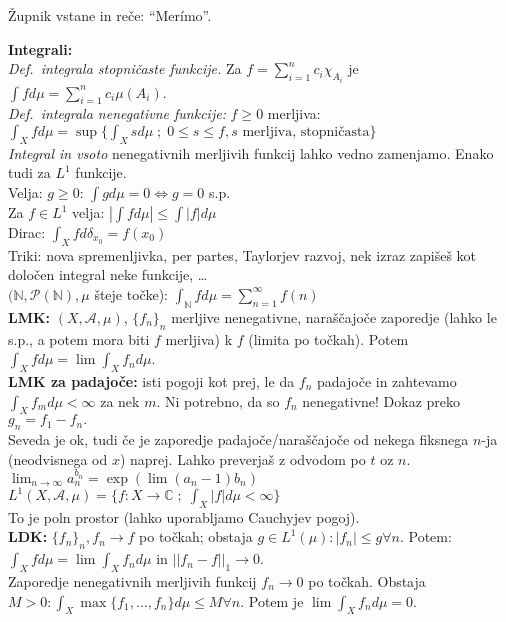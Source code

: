 \documentclass[a4paper,oneside,10pt]{article}
\title{\Title}
\author{\Author}
\date{\today}
\theoremstyle{definition}
\newcommand{\N}{\ensuremath{\mathbb{N}}}
\renewcommand{\C}{\ensuremath{\mathbb{C}}}
\newcommand{\A}{\ensuremath{\mathcal{A}}}
\renewcommand{\P}{\ensuremath{\mathcal{P}}}
\renewcommand{\N}{\ensuremath{\mathbb{N}}}
\renewcommand{\C}{\ensuremath{\mathbb{C}}}
\begin{document}
Župnik vstane in reče: ``Mer\'{i}mo''.

\textbf{\large Integrali:}\\
\textit{Def.~integrala stopničaste funkcije.} Za $f = \sum_{i=1}^n c_i \chi_{A_i}$ je
$\int f d\mu = \sum_{i=1}^n c_i \mu(A_i)$.\\
\textit{Def.\ integrala nenegativne funkcije: }$f \geq 0$ merljiva: $\int_X f d\mu =
\sup\{\int_X s d\mu\; ; \; 0 \leq s \leq f, s \text{ merljiva, stopničasta}\}$\\
\textit{Integral in vsoto} nenegativnih merljivih funkcij lahko vedno zamenjamo.
Enako tudi za $L^1$ funkcije.\\
Velja: $g\geq 0$: $\int g d \mu = 0 \iff g = 0$ s.p.\\
Za $f \in L^1$ velja: $|\int f d \mu| \leq \int |f| d \mu$\\
Dirac: $\int_X f d\delta_{x_0} = f(x_0)$\\
Triki: nova spremenljivka, per partes, Taylorjev razvoj, nek izraz zapišeš kot določen integral neke funkcije, \ldots\\
$(\N, \P(\N), \mu$ šteje točke): $\int_{\N} f d \mu = \sum_{n=1}^\infty f(n)$\\
\textbf{LMK: } $(X, \A, \mu)$, $\{f_n\}_n$ merljive nenegativne, naraščajoče zaporedje
(lahko le s.p., a potem mora biti $f$ merljiva) k $f$ (limita po točkah). Potem
$\int_X f d \mu = \lim \int_X f_n d \mu$.\\
\textbf{LMK za padajoče: } isti pogoji kot prej, le da $f_n$ padajoče in
zahtevamo $\int_X f_m d \mu < \infty$ za nek $m$. Ni potrebno, da so $f_n$ nenegativne!
Dokaz preko $g_n = f_1 - f_n.$\\
Seveda je ok, tudi če je zaporedje padajoče/naraščajoče od nekega fiksnega $n$-ja
(neodvisnega od $x$) naprej. Lahko preverjaš z odvodom po $t$ oz $n$.\\
$\lim_{n \to \infty} a_n^{b_n} = \exp(\lim (a_n - 1) b_n)$\\
$L^1(X, \A, \mu) = \{f:X \to \C \; ; \; \int_X |f| d\mu < \infty\}$\\
To je poln prostor (lahko uporabljamo Cauchyjev pogoj).\\
\textbf{LDK: } $\{f_n\}_n, f_n \to f$ po točkah; obstaja $g\in L^1(\mu): |f_n| \leq g \forall n$.
Potem: $\int_X f d \mu = \lim \int_X f_n d \mu$ in $||f_n - f||_1 \to 0$.\\
Zaporedje nenegativnih merljivih funkcij $f_n \to 0$ po točkah.
Obstaja $M>0: \int_X \max \{f_1, \ldots, f_n\} d \mu \leq M \forall n$.
Potem je $\lim \int_X f_n d \mu = 0$.\\
\end{document}
